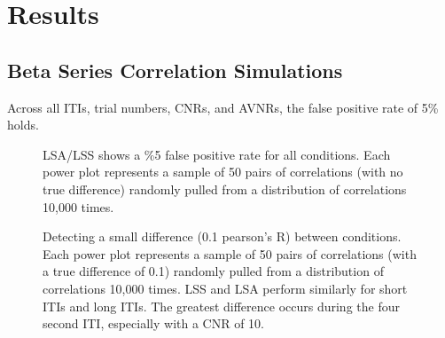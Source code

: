 \documentclass[10pt,letterpaper]{article}
\begin{document}

\section*{Results}

\subsection*{Beta Series Correlation Simulations}
Across all ITIs, trial numbers, CNRs, and AVNRs, the false positive rate of 5\%
holds.

\begin{figure}[H]
  \centering
  \subfloat{}

  \subfloat{}
  \label{fig:dnone}
\end{figure}

\begin{figure}[H]
  \ContinuedFloat
  \centering
  \subfloat{}

  \subfloat{}
  \caption{
    LSA/LSS shows a \%5 false positive rate for all conditions.
    Each power plot represents a sample of 50 pairs of correlations (with no true difference)
    randomly pulled from a distribution of correlations 10,000 times.
  }
  \label{fig:dnone}
\end{figure}

\begin{figure}[H]
  \centering
  \subfloat{}

  \subfloat{}
  \label{fig:dsmall}
\end{figure}

\begin{figure}[H]
  \ContinuedFloat
  \centering
  \subfloat{}

  \subfloat{}
  \caption{
    Detecting a small difference (0.1 pearson's R) between conditions.
    Each power plot represents a sample of 50 pairs of correlations (with a true difference of 0.1)
    randomly pulled from a distribution of correlations 10,000 times.
    LSS and LSA perform similarly for short ITIs and long ITIs.
    The greatest difference occurs during the four second ITI,
    especially with a CNR of 10.}
  \label{fig:dsmall}
\end{figure}
\end{document}
